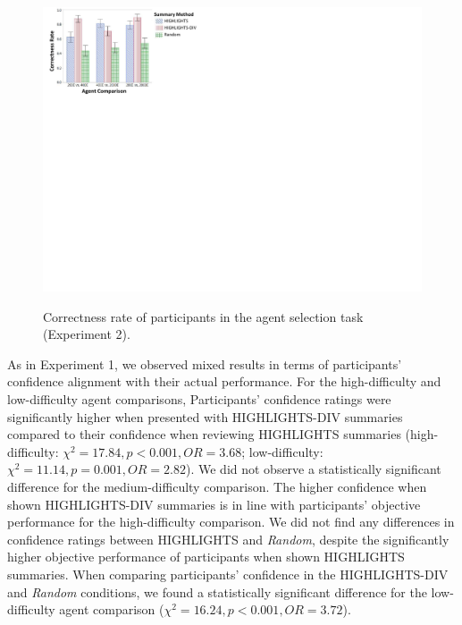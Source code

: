 \begin{figure}[h]
	\includegraphics[width=0.9\columnwidth]{figs/correctnessExp2figForPaper.pdf}\\
	\caption{Correctness rate of participants in the agent selection task (Experiment 2).}
	\label{fig:highlightsDivRes}
	\vspace{-0.3cm}
\end{figure}

As in Experiment 1, we observed mixed results in terms of participants' confidence alignment with their actual performance. For the high-difficulty and low-difficulty agent comparisons, Participants' confidence ratings were significantly higher when presented with HIGHLIGHTS-DIV summaries compared to their confidence when reviewing HIGHLIGHTS summaries (high-difficulty: $\chi^2=17.84, p<0.001, OR = 3.68$; low-difficulty: $\chi^2=11.14, p=0.001, OR = 2.82$). We did not observe a statistically significant difference for the medium-difficulty comparison. The higher confidence when shown HIGHLIGHTS-DIV summaries is in line with participants' objective performance for the high-difficulty comparison. We did not find any differences in confidence ratings between HIGHLIGHTS and \emph{Random}, despite the significantly higher objective performance of participants when shown HIGHLIGHTS summaries. When comparing participants' confidence in the HIGHLIGHTS-DIV and \emph{Random} conditions, we found a statistically significant difference for the low-difficulty agent comparison ($\chi^2=16.24, p<0.001, OR = 3.72$). 




